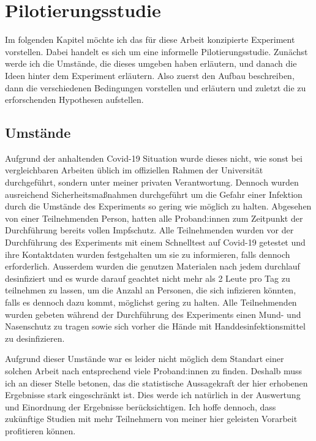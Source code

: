 

\chapter{Pilotierungsstudie}\label{chapter:experiment}

Im folgenden Kapitel möchte ich das für diese Arbeit konzipierte Experiment vorstellen. Dabei handelt es sich um eine informelle Pilotierungsstudie.
Zunächst werde ich die Umstände, die dieses umgeben haben erläutern, und danach die Ideen hinter dem Experiment erläutern. Also zuerst den Aufbau beschreiben, dann die verschiedenen Bedingungen vorstellen und erläutern und zuletzt die zu erforschenden Hypothesen aufstellen.

    \section{Umstände}
    Aufgrund der anhaltenden Covid-19 Situation wurde dieses nicht, wie sonst bei vergleichbaren Arbeiten üblich im offiziellen Rahmen der Universität durchgeführt, sondern unter meiner privaten Verantwortung. Dennoch wurden ausreichend Sicherheitsmaßnahmen durchgeführt um die Gefahr einer Infektion durch die Umstände des Experiments so gering wie möglich zu halten. Abgesehen von einer Teilnehmenden Person, hatten alle Proband:innen zum Zeitpunkt der Durchführung bereits vollen Impfschutz.
    Alle Teilnehmenden wurden vor der Durchführung des Experiments mit einem Schnelltest auf Covid-19 getestet und ihre Kontaktdaten wurden festgehalten um sie zu informieren, falls dennoch erforderlich. Ausserdem wurden die genutzen Materialen nach jedem durchlauf desinfiziert und es wurde darauf geachtet nicht mehr als
    2 %
    Leute pro Tag zu teilnehmen zu lassen, um die Anzahl an Personen, die sich infizieren könnten, falls es dennoch dazu kommt, möglichst gering zu halten.
    Alle Teilnehmenden wurden gebeten während der Durchführung des Experiments einen Mund- und Nasenschutz zu tragen sowie sich vorher die Hände mit Handdesinfektionsmittel zu desinfizieren.

    Aufgrund dieser Umstände war es leider nicht möglich dem Standart einer solchen Arbeit nach entsprechend viele Proband:innen zu finden. Deshalb muss ich an dieser Stelle betonen, das die statistische Aussagekraft der hier erhobenen Ergebnisse stark eingeschränkt ist. Dies werde ich natürlich in der Auswertung und Einordnung der Ergebnisse berücksichtigen. Ich hoffe dennoch, dass zukünftige Studien mit mehr Teilnehmern von meiner hier geleisten Vorarbeit profitieren können.

